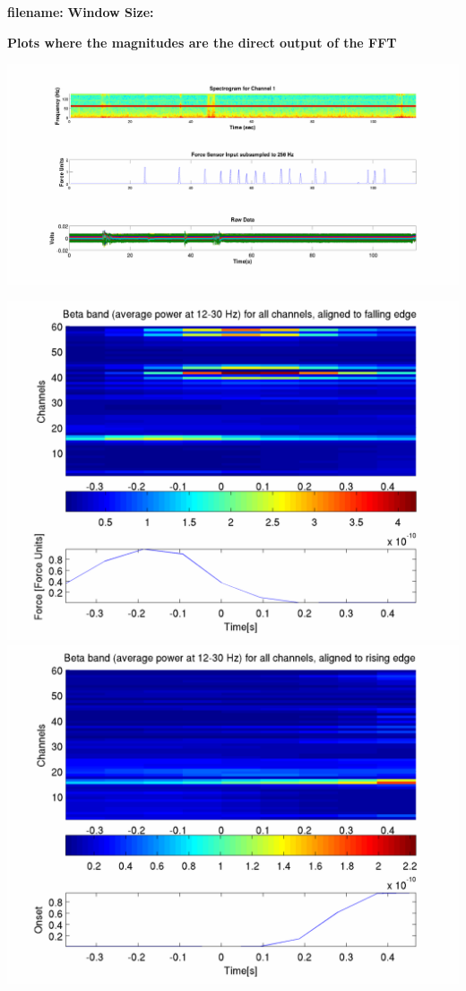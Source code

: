 \documentclass[12pt]{article}
\begin{document}
\begin{center}
\textbf{filename: \expandafter\detokenize\expandafter{\myvar}}
\textbf{Window Size: \expandafter\detokenize\expandafter{\window}}

\textbf{Plots where the magnitudes are the direct output of the FFT}
\end{center}

\includegraphics[scale=0.14]{raw_data_spectrogram.png}

\includegraphics[scale=0.2]{beta_falling.png}
\includegraphics[scale=0.2]{beta_rising.png}
\end{document}
